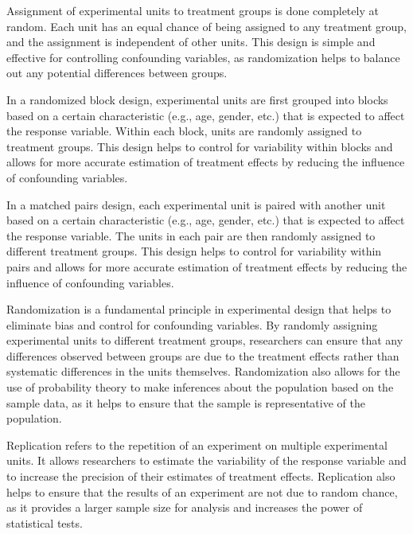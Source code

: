 \documentclass[answers,12pt,addpoints]{exam}
\begin{document}
\begin{definition}
    Assignment of experimental units to treatment groups is done completely at random. Each unit has an equal chance of being assigned to any treatment group, and the assignment is independent of other units. This design is simple and effective for controlling confounding variables, as randomization helps to balance out any potential differences between groups.
\end{definition}

\begin{definition}
    In a randomized block design, experimental units are first grouped into blocks based on a certain characteristic (e.g., age, gender, etc.) that is expected to affect the response variable. Within each block, units are randomly assigned to treatment groups. This design helps to control for variability within blocks and allows for more accurate estimation of treatment effects by reducing the influence of confounding variables.
\end{definition}

\begin{definition}
    In a matched pairs design, each experimental unit is paired with another unit based on a certain characteristic (e.g., age, gender, etc.) that is expected to affect the response variable. The units in each pair are then randomly assigned to different treatment groups. This design helps to control for variability within pairs and allows for more accurate estimation of treatment effects by reducing the influence of confounding variables.
\end{definition}

\begin{remark}
    Randomization is a fundamental principle in experimental design that helps to eliminate bias and control for confounding variables. By randomly assigning experimental units to different treatment groups, researchers can ensure that any differences observed between groups are due to the treatment effects rather than systematic differences in the units themselves. Randomization also allows for the use of probability theory to make inferences about the population based on the sample data, as it helps to ensure that the sample is representative of the population.
\end{remark}

\begin{remark}
    Replication refers to the repetition of an experiment on multiple experimental units. It allows researchers to estimate the variability of the response variable and to increase the precision of their estimates of treatment effects. Replication also helps to ensure that the results of an experiment are not due to random chance, as it provides a larger sample size for analysis and increases the power of statistical tests.
\end{remark}
\end{document}
